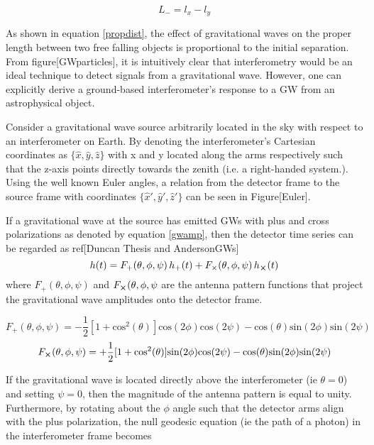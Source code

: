 \documentclass[oneside]{book}
\begin{document}
	\begin{equation}
	L_{-} = l_{x} - l_{y}
	\end{equation}
	
	As shown in equation \ref{propdist}, the effect of gravitational waves on the proper length between two free falling objects is proportional to the initial separation.  From figure[GWparticles], it is intuitively clear that interferometry would be an ideal technique to detect signals from a gravitational wave.  However, one can explicitly derive a ground-based interferometer's response to a GW from an astrophysical object.
	
	Consider a gravitational wave source arbitrarily located in the sky with respect to an interferometer on Earth. By denoting the interferometer's Cartesian coordinates as $\{\hat{x},\hat{y},\hat{z}\}$ with x and y located along the arms respectively such that the z-axis points directly towards the zenith (i.e. a right-handed system.).  Using the well known Euler angles, a relation from the detector frame to the source frame with coordinates $\{\hat{x}',\hat{y}',\hat{z}'\}$ can be seen in Figure[Euler]. 
	
	If a gravitational wave at the source has emitted GWs with plus and cross polarizations as denoted by equation \ref{gwamp}, then the detector time series can be regarded as ref[Duncan Thesis and AndersonGWs]
	\begin{equation}
	h(t) = F_{+}(\theta,\phi,\psi) \, h_{+}(t) + F_{\times}(\theta,\phi,\psi) \, h_{\cross}(t)
	\end{equation}
	where $F_{+}(\theta,\phi,\psi)$ and $F_{\cross}(\theta,\phi,\psi$ are the antenna pattern functions that project the gravitational wave amplitudes onto the detector frame.
	
	\begin{equation}
	F_{+}(\theta,\phi,\psi) = -\frac{1}{2}[1+\text{cos}^2(\theta)] \text{cos}(2\phi) \text{cos}(2\psi) - \text{cos}(\theta) \text{sin}(2\phi) \text{sin}(2\psi)
	\end{equation}
	\begin{equation}
	F_{\cross}(\theta,\phi,\psi) = + \frac{1}{2}[1+\text{cos}^2(\theta)] \text{sin}(2\phi) \text{cos}(2\psi) - \text{cos}(\theta) \text{sin}(2\phi) \text{sin}(2\psi)
	\end{equation}
	
	If the gravitational wave is located directly above the interferometer (ie $\theta = 0$) and setting $\psi=0$, then the magnitude of the antenna pattern is equal to unity.  Furthermore, by rotating about the $\phi$ angle such that the detector arms align with the plus polarization, the null geodesic equation (ie the path of a photon) in the interferometer frame becomes 
	
\end{document}
